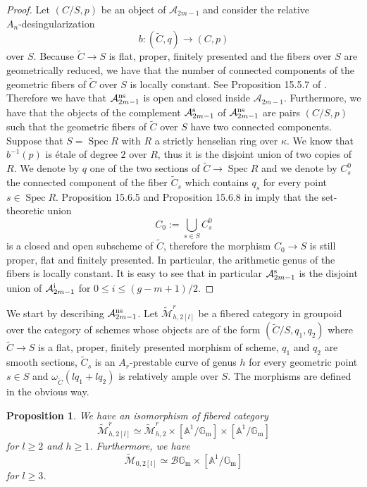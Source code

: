 \documentclass{alggeom}
\numberwithin{equation}{section}
\numberwithin{subsection}{section}
\newtheorem{proposition}[theorem]{Proposition}
\theoremstyle{definition}
\theoremstyle{remark}
\newcommand\cA{\mathcal{A}} \newcommand\cB{\mathcal{B}}
\renewcommand\AA{\mathbb{A}} \newcommand\BB{\mathbb{B}}
\newcommand\GG{\mathbb{G}} \newcommand\HH{\mathbb{H}}
\newcommand\rmm{\mathrm{m}} \newcommand\rmn{\mathrm{n}}
\newcommand\spec{\operatorname{Spec}}
\newcommand{\gm}{\GG_{\rmm}}
\newcommand{\Mtilde}{\widetilde{\mathcal M}}
\begin{document}
\begin{proof}
	Let $(C/S,p)$ be an object of $\cA_{2m-1}$ and consider the relative \\ $A_n$-desingularization $$b:(\widetilde{C},q)\rightarrow (C,p)$$
	over $S$. Because $\widetilde{C}\rightarrow S$ is flat, proper, finitely presented and the fibers over $S$ are geometrically reduced, we have that the number of connected components of the geometric fibers of $\widetilde{C}$ over $S$ is locally constant. See Proposition 15.5.7 of \cite{EGA}. Therefore we have that $\cA_{2m-1}^{\rm ns}$ is open and closed inside $\cA_{2m-1}$. Furthermore, we have that the objects of the complement $\cA_{2m-1}^{\rm s}$ of $\cA_{2m-1}^{\rm ns}$ are pairs $(C/S,p)$ such that the geometric fibers of $\widetilde{C}$ over $S$ have two connected components. Suppose that $S=\spec R$ with $R$ a strictly henselian ring over $\kappa$. We know that $b^{-1}(p)$ is \'etale of degree $2$ over $R$, thus it is the disjoint union of two copies of $R$. We denote by $q$ one of the two sections of $\widetilde{C}\rightarrow \spec R$ and we denote by $C_s^0$ the connected component of the fiber $\widetilde{C}_s$ which contains $q_s$ for every point $s \in \spec R$. Proposition 15.6.5 and Proposition 15.6.8 in \cite{EGA} imply that the set-theoretic union 
	$$ C_0:=\bigcup_{s \in S} C_s^0$$
	is a closed and open subscheme of $\widetilde{C}$, therefore the morphism $C_0\rightarrow S$ is still proper, flat and finitely presented. In particular, the arithmetic genus of the fibers is locally constant. It is easy to see that in particular $\cA_{2m-1}^{\rm s}$ is the disjoint union of $\cA_{2m-1}^{\rm i}$ for $0\leq i\leq (g-m+1)/2$.
\end{proof}


We start by describing $\cA_{2m-1}^{\rm ns}$. Let $\Mtilde_{h,2[l]}^r$ be a fibered category in groupoid over the category of schemes whose objects are of the form $(\widetilde{C}/S,q_1,q_2)$ where $\widetilde{C}\rightarrow S$ is a flat, proper, finitely presented morphism of scheme, $q_1$ and $q_2$ are smooth sections, $\widetilde{C}_s$ is an $A_r$-prestable curve of genus $h$ for every geometric point $s \in S$ and $\omega_{\widetilde{C}}(lq_1+lq_2)$ is relatively ample over $S$. The morphisms are defined in the obvious way. 

\begin{proposition}
	We have an isomorphism  of fibered category
	$$\Mtilde_{h,2[l]}^r\simeq  \Mtilde_{h,2}^r \times [\AA^1/\gm] \times [\AA^1/\gm]$$
	for $l\geq 2$ and $h\geq 1$. Furthermore, we have 
	$$ \Mtilde_{0,2[l]}\simeq \cB\gm \times [\AA^1/\gm]$$
	for $l\geq 3$.
\end{proposition}
\end{document}
